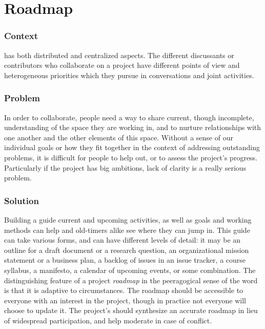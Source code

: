 

\section{Roadmap} \label{sec:Roadmap}



\subsubsection*{Context}  has both distributed and centralized aspects. The different discussants or contributors who collaborate on a project have different points of view and heterogeneous priorities which they pursue in conversations and joint activities.

\subsubsection*{Problem} In order to collaborate, people need a way to share current, though incomplete, understanding of the space they are working in, and to nurture relationships with one another and the other elements of this space.  Without a sense of our individual goals or how they fit together in the context of addressing outstanding problems, it is difficult for people to help out, or to assess the 
project's progress.  Particularly if the project has big ambitions, lack of clarity is a really serious problem.

\subsubsection*{Solution} Building a guide current and upcoming activities, as well as goals and working methods can help  and old-timers alike see where they can jump in.  This guide can take various forms, and can have different levels of detail: it may be an outline for a draft document or a research question, an organizational mission statement or a business plan, a backlog of issues in an issue tracker, a course syllabus, a manifesto, a calendar of upcoming events, or some combination.  The distinguishing feature of a project \emph{roadmap} in the peeragogical sense of the word is that it is adaptive to circumstances.  The roadmap should be accessible to everyone with an interest in the project, though in practice not everyone will choose to update it.  The project's  should synthesize an accurate roadmap in lieu of widespread participation, and help moderate in case of conflict.

